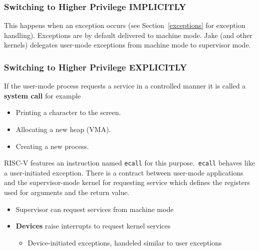 \subsubsection{Switching to Higher Privilege IMPLICITLY}

This happens when an exception occurs (see Section~\ref{exceptions} for exception handling). Exceptions are by default delivered to machine mode. Jake (and other kernels) delegates user-mode exceptions from machine mode to supervisor mode. 

\subsubsection{Switching to Higher Privilege EXPLICITLY}

If the user-mode process requests a service in a controlled manner it is called a \textbf{system call} for example
\begin{itemize}
    \item Printing a character to the screen.
    \item Allocating a new heap (VMA).
    \item Creating a new process.
\end{itemize}

RISC-V features an instruction named \texttt{ecall} for this purpose.\ \texttt{ecall} behaves like a user-initiated exception. There is a contract between user-mode applications and the supervisor-mode kernel for requesting service which defines the registers used for arguments and the return value.

\newpar{}

\begin{itemize}
    \item Supervisor can request services from machine mode
    \item \textbf{Devices} raise interrupts to request kernel services
    \begin{itemize}
        \item Device-initiated exceptions, handeled similar to user exceptions
    \end{itemize} 
\end{itemize}

